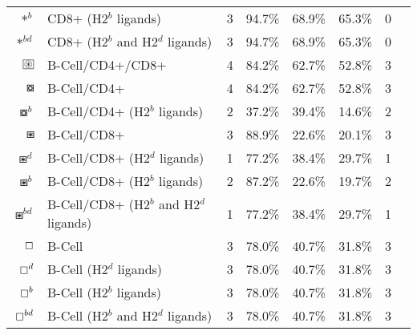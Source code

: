 \begin{tabular}{rllccccc}
                                          $ \ast^b $ &                    CD8+ (H2$^b$ ligands) &            3 &         94.7\% &          68.9\% &         65.3\% &                          0 \\
                                       $ \ast^{bd} $ &         CD8+ (H2$^b$ and H2$^d$ ligands) &            3 &         94.7\% &          68.9\% &         65.3\% &                          0 \\
 $ \setlength{\fboxsep}{0.5pt} \boxed{\circledast} $ &                         B-Cell/CD4+/CD8+ &            4 &         84.2\% &          62.7\% &         52.8\% &                          3 \\
                                      $ \boxcircle $ &                              B-Cell/CD4+ &            4 &         84.2\% &          62.7\% &         52.8\% &                          3 \\
                                    $ \boxcircle^b $ &             B-Cell/CD4+ (H2$^b$ ligands) &            2 &         37.2\% &          39.4\% &         14.6\% &                          2 \\
                                         $ \boxast $ &                              B-Cell/CD8+ &            3 &         88.9\% &          22.6\% &         20.1\% &                          3 \\
                                       $ \boxast^d $ &             B-Cell/CD8+ (H2$^d$ ligands) &            1 &         77.2\% &          38.4\% &         29.7\% &                          1 \\
                                       $ \boxast^b $ &             B-Cell/CD8+ (H2$^b$ ligands) &            2 &         87.2\% &          22.6\% &         19.7\% &                          2 \\
                                    $ \boxast^{bd} $ &  B-Cell/CD8+ (H2$^b$ and H2$^d$ ligands) &            1 &         77.2\% &          38.4\% &         29.7\% &                          1 \\
                                       $ \boxempty $ &                                   B-Cell &            3 &         78.0\% &          40.7\% &         31.8\% &                          3 \\
                                     $ \boxempty^d $ &                  B-Cell (H2$^d$ ligands) &            3 &         78.0\% &          40.7\% &         31.8\% &                          3 \\
                                     $ \boxempty^b $ &                  B-Cell (H2$^b$ ligands) &            3 &         78.0\% &          40.7\% &         31.8\% &                          3 \\
                                  $ \boxempty^{bd} $ &       B-Cell (H2$^b$ and H2$^d$ ligands) &            3 &         78.0\% &          40.7\% &         31.8\% &                          3 \\
\bottomrule
\end{tabular}

